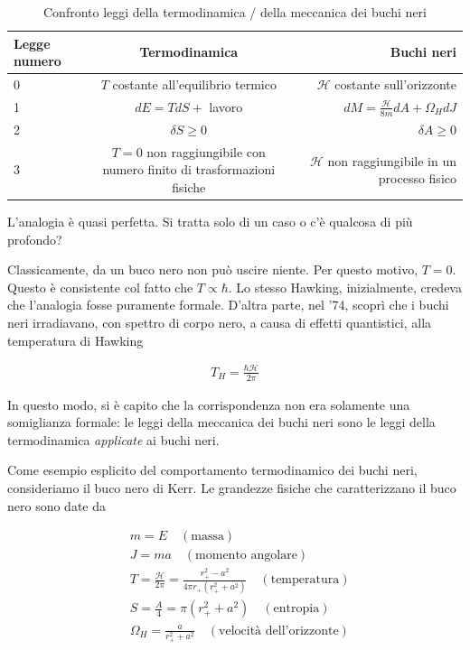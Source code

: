 \documentclass{report}
\begin{document}
\begin{table}[h]
\centering 
\begin{tabular}{|l|c|r|}
\hline
\textbf{Legge numero} & \textbf{Termodinamica} & \textbf{Buchi neri} \\ \hline
0   & \(T\) costante all'equilibrio termico           & \(\mathcal{H}\) costante sull'orizzonte    \\ \hline
1  & \(dE = TdS + \) lavoro           & \(dM = \frac{\mathcal{H}}{8m}dA + \Omega_H dJ\)      \\ \hline
2 & \(\delta S \geq 0 \) & \(\delta A \geq 0 \) \\ \hline 
3 & \(T=0\) non raggiungibile con numero finito di trasformazioni fisiche & \(\mathcal{H}\) non raggiungibile in un processo fisico \\ \hline
\end{tabular}
\caption{Confronto leggi della termodinamica / della meccanica dei buchi neri}
\end{table}

L'analogia è quasi perfetta. Si tratta solo di un caso o c'è qualcosa di più profondo? 

Classicamente, da un buco nero non può uscire niente. Per questo motivo, \(T=0\). Questo è consistente col fatto che \(T \propto \hbar\). Lo stesso Hawking, inizialmente, credeva che l'analogia fosse puramente formale. D'altra parte, nel '74, scoprì che i buchi neri irradiavano, con spettro di corpo nero, a causa di effetti quantistici, alla temperatura di Hawking

\begin{align}
    T_H  = \frac{\hbar\mathcal{H}}{2\pi}
\end{align}

In questo modo, si è capito che la corrispondenza non era solamente una somiglianza formale: le leggi della meccanica dei buchi neri sono le leggi della termodinamica \emph{applicate} ai buchi neri. 

Come esempio esplicito del comportamento termodinamico dei buchi neri, consideriamo il buco nero di Kerr. Le grandezze fisiche che caratterizzano il buco nero sono date da 

\begin{align}
    &m = E \quad (\text{massa}) \\
    &J = ma \quad (\text{momento angolare}) \\
    &T = \frac{\mathcal{H}}{2\pi} = \frac{r_+^2-a^2}{4\pi r_+(r_+^2 +a^2)} \quad (\text{temperatura}) \\
    &S = \frac{A}{4} = \pi(r^2_+ + a^2) \quad (\text{entropia}) \\
    &\Omega_H = \frac{a}{r^2_+ + a^2} \quad (\text{velocità dell'orizzonte})
\end{align}
\end{document}
